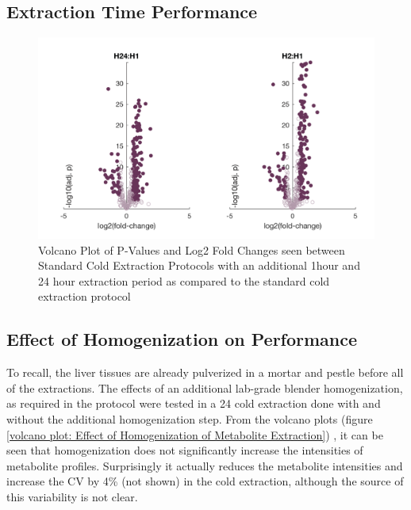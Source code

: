 \documentclass[a4paper]{book}
\begin{document}
	\subsection*{Extraction Time Performance}
	\begin{figure}[htb]
		\centering
		\includegraphics[height=0.3\textheight]{2.Optimizaiton_Figures/H1-H24-H2-01}
		\caption{Volcano Plot of P-Values and Log2 Fold Changes seen between Standard Cold Extraction Protocols with an additional 1hour and 24 hour extraction period as compared to the standard cold extraction protocol}
		\label{volcano plot: 24h, 1h and 2h cold extraction comparisons}
	\end{figure}
	
	\subsection*{Effect of Homogenization on Performance}
	
	To recall, the liver tissues are already pulverized in a mortar and pestle before all of the extractions. The effects of an additional lab-grade blender homogenization, as required in the \citeauthor{Williams2016SystemsFunction} protocol were tested in a 24 cold extraction done with and without the additional homogenization step. From the volcano plots (figure \ref{volcano plot: Effect of Homogenization of Metabolite Extraction}) , it can be seen that homogenization does not significantly increase the intensities of metabolite profiles. Surprisingly it actually reduces the metabolite intensities and increase the CV by 4\% (not shown) in the cold extraction, although the source of this variability is not clear.
	
\end{document}
